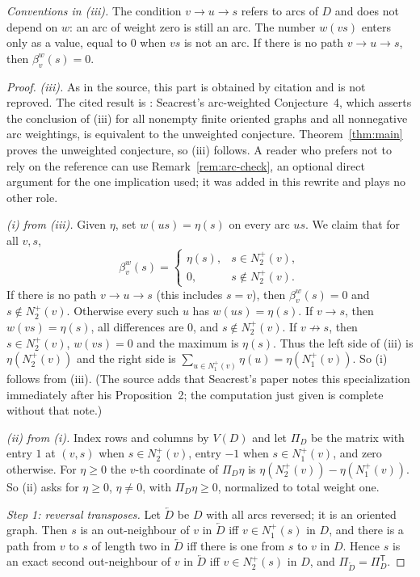 \documentclass[11pt]{article}
\theoremstyle{remark}
\newcommand{\tp}{^{\mathsf T}}
\begin{document}
\emph{Conventions in \textup{(iii)}.} The condition $v\to u\to s$ refers to
arcs of $D$ and does not depend on $w$: an arc of weight zero is still an
arc. The number $w(vs)$ enters only as a value, equal to $0$ when $vs$ is not
an arc. If there is no path $v\to u\to s$, then $\beta_v^w(s)=0$.

\begin{proof}
\emph{\textup{(iii)}.} As in the source, this part is obtained by citation
and is not reproved. The cited result is
\cite[Proposition~2]{Seacrest2015}: Seacrest's arc-weighted Conjecture~4,
which asserts the conclusion of \textup{(iii)} for all nonempty finite
oriented graphs and all nonnegative arc weightings, is equivalent to the
unweighted conjecture. Theorem~\ref{thm:main} proves the unweighted
conjecture, so \textup{(iii)} follows. A reader who prefers not to rely on
the reference can use Remark~\ref{rem:arc-check}, an optional direct
argument for the one implication used; it was added in this rewrite and
plays no other role.

\emph{\textup{(i)} from \textup{(iii)}.} Given $\eta$, set $w(us)=\eta(s)$
on every arc $us$. We claim that for all $v,s$,
\[
 \beta_v^w(s)=
 \begin{cases}
  \eta(s),&s\in N_2^+(v),\\
  0,&s\notin N_2^+(v).
 \end{cases}
\]
If there is no path $v\to u\to s$ (this includes $s=v$), then
$\beta_v^w(s)=0$ and $s\notin N_2^+(v)$. Otherwise every such $u$ has
$w(us)=\eta(s)$. If $v\to s$, then $w(vs)=\eta(s)$, all differences are
$0$, and $s\notin N_2^+(v)$. If $v\not\to s$, then $s\in N_2^+(v)$,
$w(vs)=0$ and the maximum is $\eta(s)$. Thus the left side of
\textup{(iii)} is $\eta(N_2^+(v))$ and the right side is
$\sum_{u\in N_1^+(v)}\eta(u)=\eta(N_1^+(v))$. So \textup{(i)} follows
from \textup{(iii)}. (The source adds that Seacrest's paper notes this
specialization immediately after his Proposition~2; the computation just
given is complete without that note.)

\emph{\textup{(ii)} from \textup{(i)}.} Index rows and columns by $V(D)$
and let $\Pi_D$ be the matrix with entry $1$ at $(v,s)$ when
$s\in N_2^+(v)$, entry $-1$ when $s\in N_1^+(v)$, and zero otherwise. For
$\eta\ge0$ the $v$-th coordinate of $\Pi_D\eta$ is
$\eta(N_2^+(v))-\eta(N_1^+(v))$. So \textup{(ii)} asks for $\eta\ge0$,
$\eta\ne0$, with $\Pi_D\eta\ge0$, normalized to total weight one.

\emph{Step 1: reversal transposes.} Let $\overleftarrow D$ be $D$ with all
arcs reversed; it is an oriented graph. Then $s$ is an out-neighbour of $v$
in $\overleftarrow D$ iff $v\in N_1^+(s)$ in $D$, and there is a path from
$v$ to $s$ of length two in $\overleftarrow D$ iff there is one from $s$ to
$v$ in $D$. Hence $s$ is an exact second out-neighbour of $v$ in
$\overleftarrow D$ iff $v\in N_2^+(s)$ in $D$, and
$\Pi_{\overleftarrow D}=\Pi_D\tp$.


\end{proof}
\end{document}
